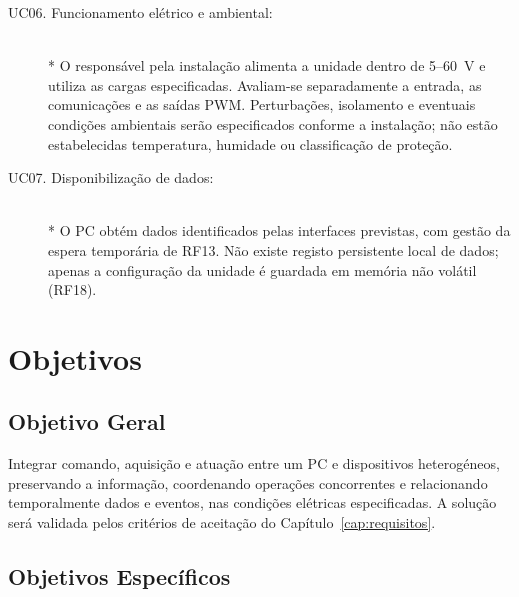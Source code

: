 \begin{description}
    \item[UC06. Funcionamento elétrico e ambiental:] \hfill\\*
    O responsável pela instalação alimenta a unidade dentro de 5--60~V
    e utiliza as cargas especificadas. Avaliam-se separadamente a entrada,
    as comunicações e as saídas PWM. Perturbações, isolamento e eventuais
    condições ambientais serão especificados conforme a instalação;
    não estão estabelecidas temperatura, humidade ou classificação de proteção.

    \item[UC07. Disponibilização de dados:] \hfill\\*
    O PC obtém dados identificados pelas interfaces previstas, com gestão
    da espera temporária de RF13. Não existe registo persistente local de
    dados; apenas a configuração da unidade é guardada em memória não
    volátil (RF18).
\end{description}

\section{Objetivos}

\subsection{Objetivo Geral}

Integrar comando, aquisição e atuação entre um PC e dispositivos
heterogéneos, preservando a informação, coordenando operações concorrentes
e relacionando temporalmente dados e eventos, nas condições elétricas
especificadas. A solução será validada pelos critérios de aceitação do
Capítulo~\ref{cap:requisitos}.

\subsection{Objetivos Específicos}

